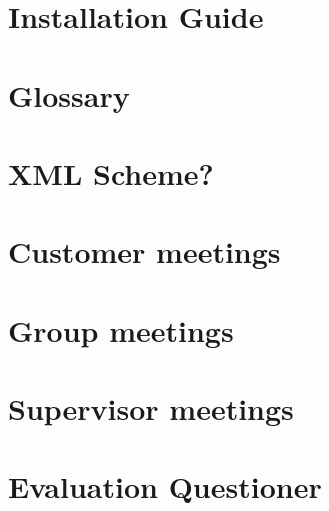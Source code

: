 \documentclass{report}
\begin{document}
\chapter{Installation Guide}
\chapter{Glossary}
\chapter{XML Scheme?}
\chapter{Customer meetings}
\chapter{Group meetings}
\chapter{Supervisor meetings}
\chapter{Evaluation Questioner}

%
\end{document}
